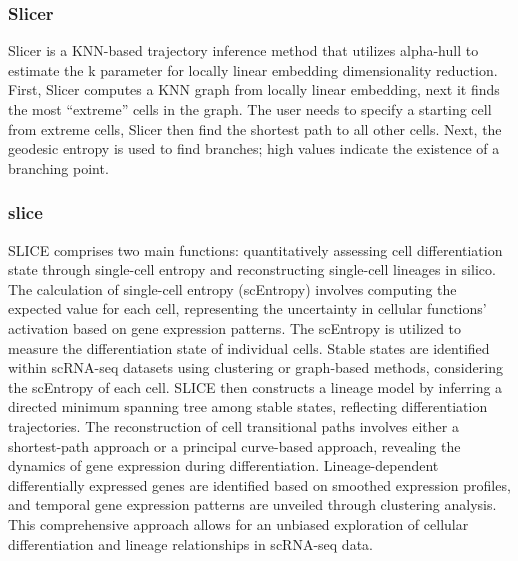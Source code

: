 \subsubsection{Slicer}
Slicer is a KNN-based trajectory inference method that utilizes alpha-hull to estimate the k parameter for locally linear embedding dimensionality reduction. First, Slicer computes a KNN graph from locally linear embedding, next it finds the most “extreme” cells in the graph. The user needs to specify a starting cell from extreme cells, Slicer then find the shortest path to all other cells. Next, the geodesic entropy is used to find branches; high values indicate the existence of a branching point.
\subsubsection{slice} SLICE comprises two main functions: quantitatively assessing cell differentiation state through single-cell entropy and reconstructing single-cell lineages in silico. The calculation of single-cell entropy (scEntropy) involves computing the expected value for each cell, representing the uncertainty in cellular functions' activation based on gene expression patterns. The scEntropy is utilized to measure the differentiation state of individual cells. Stable states are identified within scRNA-seq datasets using clustering or graph-based methods, considering the scEntropy of each cell. SLICE then constructs a lineage model by inferring a directed minimum spanning tree among stable states, reflecting differentiation trajectories. The reconstruction of cell transitional paths involves either a shortest-path approach or a principal curve-based approach, revealing the dynamics of gene expression during differentiation. Lineage-dependent differentially expressed genes are identified based on smoothed expression profiles, and temporal gene expression patterns are unveiled through clustering analysis. This comprehensive approach allows for an unbiased exploration of cellular differentiation and lineage relationships in scRNA-seq data.
